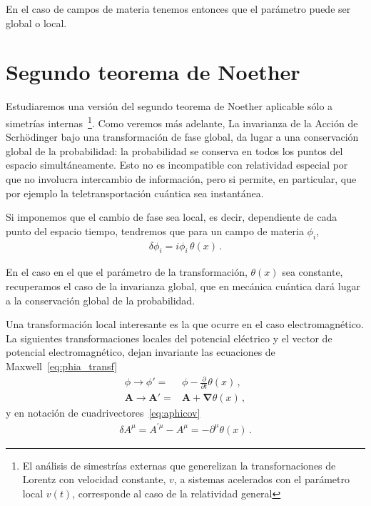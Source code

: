 En el caso de campos de materia tenemos entonces 
que el parámetro puede ser global o local.

\section{Segundo teorema de Noether}

Estudiaremos  una versión del segundo teorema de Noether aplicable sólo a simetrías internas~\footnote{El análisis de simestrías externas que generelizan la transfornaciones de Lorentz con velocidad constante, $v$, a sistemas acelerados con el parámetro local $v(t)$, corresponde al caso de la relatividad general}. Como veremos más adelante, La invarianza de la Acción de Scrhödinger bajo una transformación de fase global, da lugar a una conservación global de la probabilidad: la probabilidad se conserva en todos los puntos del espacio simultáneamente. Esto no es incompatible con relatividad especial por que no involucra intercambio de información, pero si permite, en particular, que por ejemplo la teletransportación cuántica sea instantánea.

Si imponemos que el cambio de fase sea local, es decir, dependiente de cada punto  del espacio tiempo, tendremos que para un campo de materia $\phi_{i}$, 
\begin{align}
  \delta\phi_i=i  \phi_i\,\theta(x)\,.
\end{align}

En el caso en el que el parámetro de la transformación, $\theta(x)$ sea constante, recuperamos el caso de la invarianza global, que en mecánica cuántica dará lugar a la conservación global de la probabilidad. 

Una transformación local interesante es la que ocurre en el caso electromagnético. La siguientes transformaciones locales del potencial eléctrico y el vector de potencial electromagnético, dejan invariante las ecuaciones de Maxwell~\eqref{eq:phia_transf}
\begin{align}
  \phi \to \phi'=&\phi-\frac{\partial}{\partial t}\theta(x)\,,\nonumber\\
  \mathbf{A} \to \mathbf{A}'=&\mathbf{A}+ \boldsymbol{\nabla}\theta(x)\,,
\end{align}
y en notación de cuadrivectores~\eqref{eq:aphicov}
\begin{align}
  \delta A^{\mu}=A^{\prime\mu}-A^{\mu}=-\partial^\mu \theta(x)\,.
\end{align}

